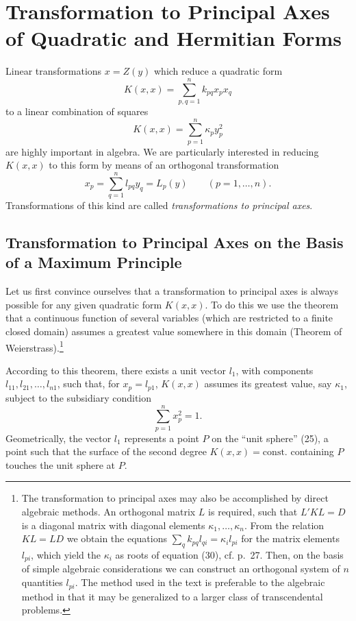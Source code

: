 \section{Transformation to Principal Axes of Quadratic and Hermitian Forms}
Linear transformations $x=Z(y)$ which reduce a quadratic form
\[K(x,x)=\sum_{p,q=1}^n k_{pq}x_px_q\]
to a linear combination of squares
\[K(x,x)=\sum_{p=1}^n \kappa_p y_p^2\]
are highly important in algebra. We are particularly interested in reducing $K(x,x)$ to this form by means of an orthogonal transformation
\[x_p=\sum_{q=1}^n l_{pq}y_q=L_p(y)\qquad (p=1,\ldots,n).\]
Transformations of this kind are called \emph{transformations to principal axes}.

\subsection{Transformation to Principal Axes on the Basis of a Maximum Principle}
Let us first convince ourselves that a transformation to principal axes is always possible for any given quadratic form $K(x,x)$. To do this we use the theorem that a continuous function of several variables (which are restricted to a finite closed domain) assumes a greatest value somewhere in this domain (Theorem of Weierstrass).\footnote{The transformation to principal axes may also be accomplished by direct algebraic methods. An orthogonal matrix $L$ is required, such that $L'KL=D$ is a diagonal matrix with diagonal elements $\kappa_1,\ldots,\kappa_n$. From the relation $KL=LD$ we obtain the equations $\sum_q k_{pq}l_{qi}=\kappa_i l_{pi}$ for the matrix elements $l_{pi}$, which yield the $\kappa_i$ as roots of equation (30), cf. p.~27. Then, on the basis of simple algebraic considerations we can construct an orthogonal system of $n$ quantities $l_{pi}$. The method used in the text is preferable to the algebraic method in that it may be generalized to a larger class of transcendental problems.}

According to this theorem, there exists a unit vector $l_1$, with components $l_{11},l_{21},\ldots,l_{n1}$, such that, for $x_p=l_{p1}$, $K(x,x)$ assumes its greatest value, say $\kappa_1$, subject to the subsidiary condition
\begin{equation}\sum_{p=1}^n x_p^2=1. \tag{25}\end{equation}
Geometrically, the vector $l_1$ represents a point $P$ on the ``unit sphere'' (25), a point such that the surface of the second degree $K(x,x)=\mathrm{const.}$ containing $P$ touches the unit sphere at $P$.

